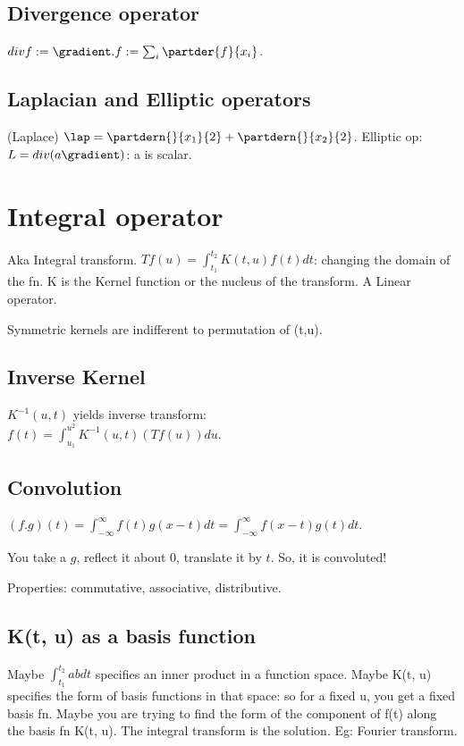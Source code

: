 \documentclass[oneside, article]{memoir}
\begin{document}
\subsection{Divergence operator}
$div f := \gradient . f:= \sum_{i} \partder{f}{x_{i}}$.

\subsection{Laplacian and Elliptic operators}
(Laplace) $\lap = \partdern{}{x_{1}}{2} + \partdern{}{x_{2}}{2}$. Elliptic op: $L = div (a\gradient)$: a is scalar.

\section{Integral operator}
Aka Integral transform. $Tf(u) = \int_{t_{1}}^{t_{2}} K(t, u)f(t)dt$: changing the domain of the fn. K is the Kernel function or the nucleus of the transform. A Linear operator.

Symmetric kernels are indifferent to permutation of (t,u).

\subsection{Inverse Kernel}
$K^{-1}(u, t)$ yields inverse transform:\\
$f(t) = \int_{u_{1}}^{u^{2}} K^{-1}(u, t) (Tf(u))du$.

\subsection{Convolution}
$(f.g)(t) = \int_{-\infty}^{\infty}f(t)g(x - t)dt =  \int_{-\infty}^{\infty}f(x-t)g(t)dt$. 

You take a $g$, reflect it about 0, translate it by $t$. So, it is convoluted!

Properties: commutative, associative, distributive.

\subsection{K(t, u) as a basis function}
Maybe $\int_{t_{1}}^{t_{2}} ab dt$ specifies an inner product in a function space. Maybe K(t, u) specifies the form of basis functions in that space: so for a fixed u, you get a fixed basis fn. Maybe you are trying to find the form of the component of f(t) along the basis fn K(t, u). The integral transform is the solution. Eg: Fourier transform.
\end{document}
